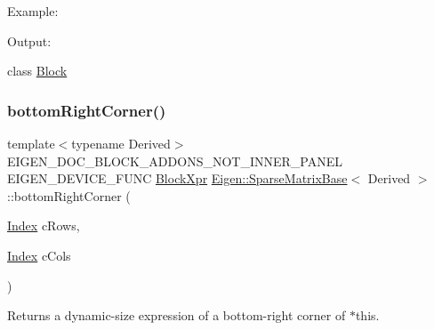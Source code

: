 Example\+: 
\begin{DoxyCodeInclude}{0}
\end{DoxyCodeInclude}
 Output\+: 
\begin{DoxyVerbInclude}
\end{DoxyVerbInclude}
 class \mbox{\hyperlink{class_eigen_1_1_block}{Block}} \mbox{\label{class_eigen_1_1_sparse_matrix_base_aa531aefed8ea1fa530c638abc8eea6c9}} 
\subsubsection{\texorpdfstring{bottomRightCorner()}{bottomRightCorner()}\hspace{0.1cm}{\footnotesize\ttfamily [1/3]}}
{\footnotesize\ttfamily template$<$typename Derived$>$ \\
E\+I\+G\+E\+N\+\_\+\+D\+O\+C\+\_\+\+B\+L\+O\+C\+K\+\_\+\+A\+D\+D\+O\+N\+S\+\_\+\+N\+O\+T\+\_\+\+I\+N\+N\+E\+R\+\_\+\+P\+A\+N\+EL E\+I\+G\+E\+N\+\_\+\+D\+E\+V\+I\+C\+E\+\_\+\+F\+U\+NC \mbox{\hyperlink{class_eigen_1_1_block}{Block\+Xpr}} \mbox{\hyperlink{class_eigen_1_1_sparse_matrix_base}{Eigen\+::\+Sparse\+Matrix\+Base}}$<$ Derived $>$\+::bottom\+Right\+Corner (\begin{DoxyParamCaption}\item[{\mbox{\hyperlink{struct_eigen_1_1_eigen_base_a554f30542cc2316add4b1ea0a492ff02}{Index}}}]{c\+Rows,  }\item[{\mbox{\hyperlink{struct_eigen_1_1_eigen_base_a554f30542cc2316add4b1ea0a492ff02}{Index}}}]{c\+Cols }\end{DoxyParamCaption})\hspace{0.3cm}{\ttfamily [inline]}}

\begin{DoxyReturn}{Returns}
a dynamic-\/size expression of a bottom-\/right corner of $\ast$this.
\end{DoxyReturn}

